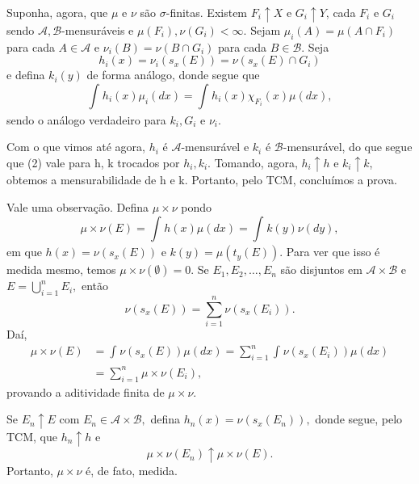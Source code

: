 \documentclass[measure_theory.tex]{subfiles}
\begin{document}
\begin{proof*}
	Suponha, agora, que \(\mu \) e \(\nu\) são \(\sigma \)-finitas. Existem \(F_{i}\uparrow X\) e \(G_{i}\uparrow Y\), cada \(F_{i}\) e \(G_{i}\) sendo \(\mathcal{A}, \mathcal{B}\)-mensuráveis e \(\mu (F_{i}), \nu(G_{i})< \infty\).
	Sejam \(\mu_{i}(A) = \mu (A\cap F_{i})\) para cada \(A\in \mathcal{A}\) e \(\nu_{i}(B) = \nu(B\cap G_{i})\) para cada \(B\in \mathcal{B}\). Seja
	\[
		h_{i}(x) = \nu_{i}(s_x(E)) = \nu(s_x(E)\cap G_{i})
	\]
	e defina \(k_{i}(y)\) de forma análogo, donde segue que
	\[
		\int_{}h_{i}(x)\mu_{i}( dx) = \int_{}h_{i}(x)\chi_{F_{i}}(x)\mu ( dx),
	\]
	sendo o análogo verdadeiro para \(k_{i}, G_{i}\) e \(\nu_{i}\).

	Com o que vimos até agora, \(h_{i}\) é \(\mathcal{A}\)-mensurável e \(k_{i}\) é \(\mathcal{B}\)-mensurável, do que segue que (2) vale para h, k trocados por \(h_{i}, k_{i}\). Tomando, agora,
	\(h_{i}\uparrow h\) e \(k_{i}\uparrow k\), obtemos a mensurabilidade de h e k. Portanto, pelo TCM, concluímos a prova. \qedsymbol
\end{proof*}
Vale uma observação. Defina \(\mu \times \nu\) pondo
\[
	\mu \times \nu (E) = \int_{}h(x)\mu ( dx) = \int_{}k(y)\nu( dy),
\]
em que \(h(x) =\nu(s_x(E)) \) e \(k(y) = \mu(t_y(E)).\) Para ver que isso é medida mesmo, temos \(\mu \times \nu(\emptyset ) = 0\). Se \(E_1, E_2, \dotsc , E_{n}\) são disjuntos em \(\mathcal{A}\times \mathcal{B}\) e \(E = \bigcup_{i=1}^{n}E_{i},\) então
\[
	\nu(s_x(E)) = \sum\limits_{i=1}^{n}\nu(s_x(E_{i})).
\]
Daí,
\begin{align*}
	\mu \times \nu(E) & = \int_{}\nu(s_x(E))\mu ( dx) = \sum\limits_{i=1}^{n}\int_{}\nu(s_x(E_{i})) \mu(dx) \\
	                  & = \sum\limits_{i=1}^{n}\mu \times \nu (E_{i}),
\end{align*}
provando a aditividade finita de \(\mu \times \nu\).

Se \(E_{n}\uparrow E\) com \(E_{n}\in \mathcal{A}\times \mathcal{B},\) defina \(h_{n}(x) = \nu(s_x(E_{n})),\) donde segue, pelo TCM, que \(h_{n}\uparrow h\) e
\[
	\mu \times \nu(E_{n})\uparrow \mu \times \nu(E).
\]
Portanto, \(\mu \times \nu\) é, de fato, medida.
\end{document}
